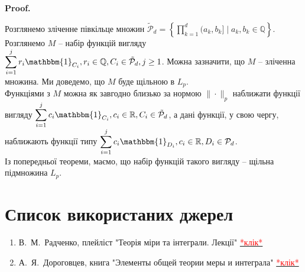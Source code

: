 \documentclass[a4paper, 10pt]{article}
\makeatletter
\theoremstyle{theoremdd}
\renewenvironment{proof}[1][Proof.\\]{\par
\pushQED{\hfill \qed}%
\normalfont \topsep6\p@\@plus6\p@\relax
\trivlist
\item\relax
{\bfseries
#1\@addpunct{.}}\hspace\labelsep\ignorespaces
}{%
\popQED\endtrivlist\@endpefalse
}
\makeatother
\begin{document}
\begin{proof}
Розглянемо зліченне півкільце множин $\displaystyle \tilde{\mathcal{P}}_d = \left\{ \prod_{k=1}^d (a_k,b_k] \mid a_k,b_k \in \mathbb{Q} \right\}$. Розглянемо $M$ -- набір функцій вигляду $\displaystyle\sum_{i=1}^j r_i \mathbbm{1}_{C_i}, r_i \in \mathbb{Q}, C_i \in \tilde{\mathcal{P}}_d, j \geq 1$. Можна зазначити, що $M$ -- зліченна множина. Ми доведемо, що $M$ буде щільною в $L_p$.\\
Функціями з $M$ можна як завгодно близько за нормою $\| \cdot \|_p$ наближати функції вигляду $\displaystyle\sum_{i=1}^j c_i \mathbbm{1}_{C_i}, c_i \in \mathbb{R}, C_i \in \tilde{\mathcal{P}}_d$, а дані функції, у свою чергу, наближають функції типу $\displaystyle\sum_{i=1}^j c_i \mathbbm{1}_{D_i}, c_i \in \mathbb{R}, D_i \in \mathcal{P}_d$.\\
Із попередньої теореми, маємо, що набір функцій такого вигляду -- щільна підмножина $L_p$.
\end{proof}

\newpage
\thispagestyle{empty}
\section*{Список використаних джерел}
\begin{enumerate}[wide=0pt]
\item В.\ М.\ Радченко, плейліст "Теорія міри та інтеграли. Лекції" \quad \href{https://www.youtube.com/@vadymradchenko8925/playlists}{\textcolor{red}{*клік*}}
\item А.\ Я.\ Дороговцев, книга "Элементы общей теории меры и интеграла" \quad \href{https://www.slideshare.net/YuriyMaturin/ss-58815473}{\textcolor{red}{*клік*}}
\end{enumerate}
\end{document}

